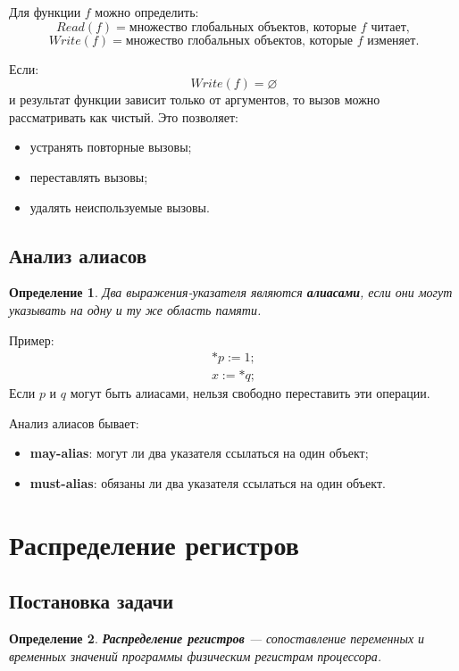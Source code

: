 \documentclass[12pt,a4paper]{article}
\newtheorem{definition}{Определение}
\begin{document}
Для функции $f$ можно определить:
\[
Read(f) = \text{множество глобальных объектов, которые } f \text{ читает},
\]
\[
Write(f) = \text{множество глобальных объектов, которые } f \text{ изменяет}.
\]

Если:
\[
Write(f)=\varnothing
\]
и результат функции зависит только от аргументов, то вызов можно рассматривать как чистый. Это позволяет:
\begin{itemize}
    \item устранять повторные вызовы;
    \item переставлять вызовы;
    \item удалять неиспользуемые вызовы.
\end{itemize}

\subsection{Анализ алиасов}

\begin{definition}
Два выражения-указателя являются \textbf{алиасами}, если они могут указывать на одну и ту же область памяти.
\end{definition}

Пример:
\[
\begin{array}{l}
*p := 1;\\
x := *q;
\end{array}
\]
Если $p$ и $q$ могут быть алиасами, нельзя свободно переставить эти операции.

Анализ алиасов бывает:
\begin{itemize}
    \item \textbf{may-alias}: могут ли два указателя ссылаться на один объект;
    \item \textbf{must-alias}: обязаны ли два указателя ссылаться на один объект.
\end{itemize}

\section{Распределение регистров}

\subsection{Постановка задачи}

\begin{definition}
\textbf{Распределение регистров} --- сопоставление переменных и временных значений программы физическим регистрам процессора.
\end{definition}
\end{document}
